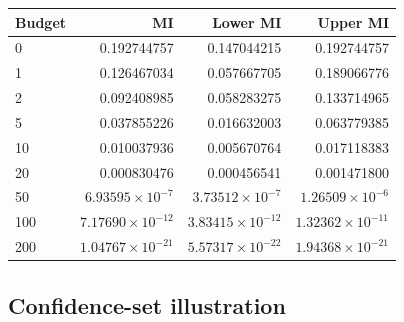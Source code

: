 \begingroup\small
\setlength{\tabcolsep}{4pt}
\begin{longtable}{lrrr}
\toprule

Budget & MI & Lower MI & Upper MI\\\midrule\endhead

0 & 0.192744757 & 0.147044215 & 0.192744757\\

1 & 0.126467034 & 0.057667705 & 0.189066776\\

2 & 0.092408985 & 0.058283275 & 0.133714965\\

5 & 0.037855226 & 0.016632003 & 0.063779385\\

10 & 0.010037936 & 0.005670764 & 0.017118383\\

20 & 0.000830476 & 0.000456541 & 0.001471800\\

50 & $6.93595\times10^{-7}$ & $3.73512\times10^{-7}$ & $1.26509\times10^{-6}$\\

100 & $7.17690\times10^{-12}$ & $3.83415\times10^{-12}$ & $1.32362\times10^{-11}$\\

200 & $1.04767\times10^{-21}$ & $5.57317\times10^{-22}$ & $1.94368\times10^{-21}$\\

\bottomrule
\end{longtable}
\endgroup

\reservetable
\subsection{Confidence-set illustration}

